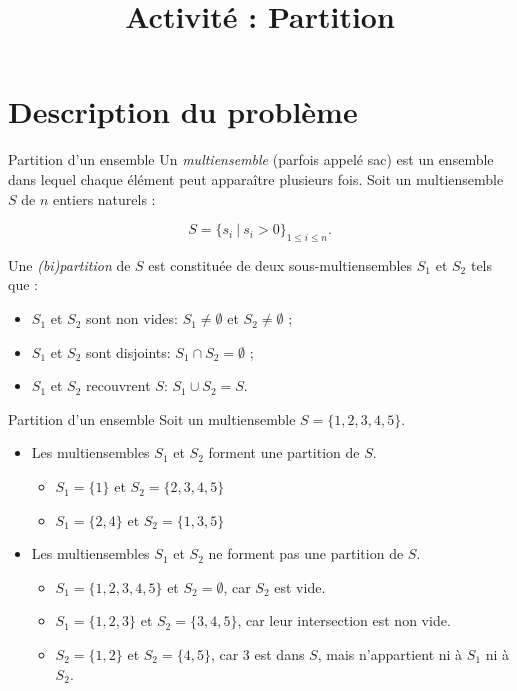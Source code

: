 \documentclass[11pt]{article}
\title{Activité : Partition}
\date{}
\begin{document}
\maketitle
\tableofcontents

\section{Description du problème}

  \begin{definition}{Partition d'un ensemble}
    Un \emph{multiensemble} (parfois appelé sac) est un ensemble dans lequel chaque élément peut apparaître plusieurs fois.
    Soit un multiensemble $S$ de $n$ entiers naturels :

    $$S = \{s_i\ |\ s_i > 0\}_{1\leq i \leq n}.$$

    Une \emph{(bi)partition} de $S$ est constituée de deux sous-multiensembles $S_1$ et $S_2$ tels que :
    \begin{itemize}
      \item $S_1$ et $S_2$ sont non vides:  $S_1 \neq \emptyset$ et $S_2 \neq \emptyset$ ;
      \item $S_1$ et $S_2$ sont disjoints:  $S_1 \cap S_2 = \emptyset$ ;
      \item $S_1$ et $S_2$ recouvrent $S$:  $S_1 \cup S_2 = S$.
    \end{itemize}
  \end{definition}

  \begin{exemple}{Partition d'un ensemble}
    Soit un multiensemble $S = \{1,2,3,4,5\}$.
    \begin{itemize}
      \item Les multiensembles $S_1$ et $S_2$ forment une partition de $S$.
        \begin{itemize}
          \item $S_1 = \{1\}$ et $S_2 = \{2,3,4,5\}$
          \item $S_1 = \{2, 4\}$ et $S_2 = \{1,3,5\}$
        \end{itemize}
      \item Les multiensembles $S_1$ et $S_2$ ne forment pas une partition de $S$.
        \begin{itemize}
          \item $S_1 = \{1,2,3,4,5\}$ et $S_2 = \emptyset$, car $S_2$ est vide.
          \item $S_1 = \{1,2,3\}$ et $S_2 = \{3,4,5\}$, car leur intersection est non vide.
          \item $S_2 = \{1,2\}$ et $S_2 = \{4, 5\}$, car 3 est dans $S$, mais n'appartient ni à $S_1$ ni à $S_2$.
        \end{itemize}
    \end{itemize}
  \end{exemple}
\end{document}
